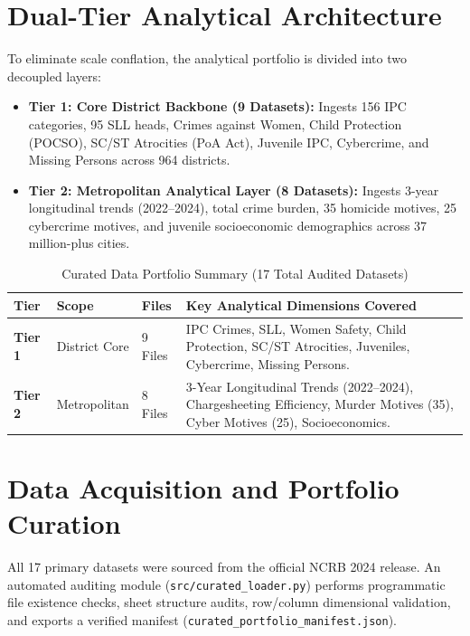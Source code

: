 \documentclass[12pt,a4paper]{report}
\begin{document}
\section{Dual-Tier Analytical Architecture}
To eliminate scale conflation, the analytical portfolio is divided into two decoupled layers:
\begin{itemize}[leftmargin=*]
    \item \textbf{Tier 1: Core District Backbone (9 Datasets):} Ingests 156 IPC categories, 95 SLL heads, Crimes against Women, Child Protection (POCSO), SC/ST Atrocities (PoA Act), Juvenile IPC, Cybercrime, and Missing Persons across 964 districts.
    \item \textbf{Tier 2: Metropolitan Analytical Layer (8 Datasets):} Ingests 3-year longitudinal trends (2022--2024), total crime burden, 35 homicide motives, 25 cybercrime motives, and juvenile socioeconomic demographics across 37 million-plus cities.
\end{itemize}

\begin{table}[h]
\centering
\small
\caption{Curated Data Portfolio Summary (17 Total Audited Datasets)}
\begin{tabular}{lllp{6.5cm}}
\toprule
\textbf{Tier} & \textbf{Scope} & \textbf{Files} & \textbf{Key Analytical Dimensions Covered} \\
\midrule
\textbf{Tier 1} & District Core & 9 Files & IPC Crimes, SLL, Women Safety, Child Protection, SC/ST Atrocities, Juveniles, Cybercrime, Missing Persons. \\
\midrule
\textbf{Tier 2} & Metropolitan & 8 Files & 3-Year Longitudinal Trends (2022--2024), Chargesheeting Efficiency, Murder Motives (35), Cyber Motives (25), Socioeconomics. \\
\bottomrule
\end{tabular}
\end{table}

\section{Data Acquisition and Portfolio Curation}
All 17 primary datasets were sourced from the official NCRB 2024 release. An automated auditing module (\texttt{src/curated\_loader.py}) performs programmatic file existence checks, sheet structure audits, row/column dimensional validation, and exports a verified manifest (\texttt{curated\_portfolio\_manifest.json}).
\end{document}
